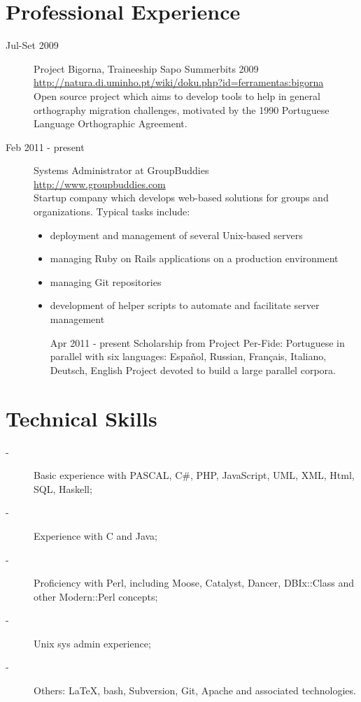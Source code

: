 \documentclass{article}
\begin{document}
\section{Professional Experience}
\begin{description}
\item [Jul-Set 2009] Project Bigorna, Traineeship Sapo Summerbits 2009\\
\url{http://natura.di.uminho.pt/wiki/doku.php?id=ferramentas:bigorna}\\
Open source project which aims to develop tools to help in general orthography migration challenges, motivated by the 1990 Portuguese Language Orthographic Agreement.
\item [Feb 2011 - present] Systems Administrator at GroupBuddies\\
\url{http://www.groupbuddies.com}\\
Startup company which develops web-based solutions for groups and organizations. Typical tasks include:
\begin{itemize}
	\item deployment and management of several Unix-based servers
	\item managing Ruby on Rails applications on a production environment
	\item managing Git repositories
	\item development of helper scripts to automate and facilitate server management
\item [Apr 2011 - present] Scholarship from Project Per-Fide: Portuguese in parallel with six languages: Español, Russian, Français, Italiano, Deutsch, English
Project devoted to build a large parallel corpora.

\end{itemize}

\end{description}

\section{Technical Skills}
\begin{description}
\item[-] Basic experience with PASCAL, C\#, PHP, JavaScript, UML, XML, Html, SQL, Haskell;
\item[-] Experience with C and Java;
\item[-] Proficiency with  Perl, including Moose, Catalyst, Dancer, DBIx::Class and other Modern::Perl concepts;
\item[-] Unix sys admin experience;
\item[-] Others: \LaTeX, bash, Subversion, Git, Apache and associated technologies.
\end{description}
\end{document}
